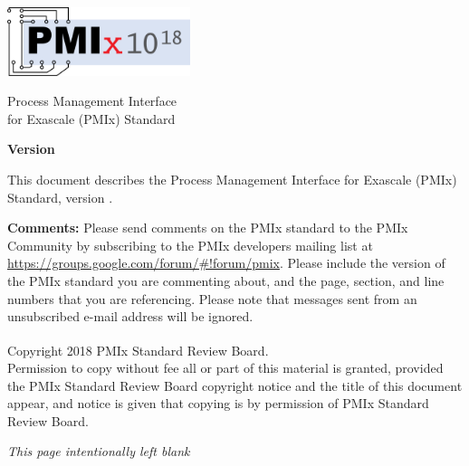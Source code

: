 
  \begin{titlepage}
    \begin{flushleft}
     \hspace{-6em} \includegraphics[width=0.4\textwidth]{figs/pmix-logo.png}
    \end{flushleft}

    \begin{adjustwidth}{-0.75in}{0in}
    \begin{center}
      \Huge
      \textsf{Process Management Interface\\for Exascale (PMIx) Standard}

      \vspace{1.0in}
	  \huge
      \textbf{Version \VER{}}
      
      \vspace{0.15in}
	  \Large
      \textbf{\VERDATE}
      
    \end{center}
    \end{adjustwidth}

    \vspace{1.2in}

\par
This document describes the Process Management Interface for Exascale (PMIx) Standard, version \VER{}.

\par
\textbf{Comments:}
Please send comments on the PMIx standard to the PMIx Community by subscribing to the PMIx developers mailing list at \url{https://groups.google.com/forum/#!forum/pmix}.
Please include the version of the PMIx standard you are commenting about, and the page, section, and line numbers that you are referencing.
Please note that messages sent from an unsubscribed e-mail address will be ignored.

\vfill

\begin{adjustwidth}{0pt}{1em}\setlength{\parskip}{0.25\baselineskip}%
Copyright \textsuperscript{\textcopyright} 2018 PMIx Standard Review Board.\\
Permission to copy without fee all or part of this material is granted,
provided the PMIx Standard Review Board copyright notice and
the title of this document appear, and notice is given that copying is by
permission of PMIx Standard Review Board.
\end{adjustwidth}

  \end{titlepage}

\clearpage
\thispagestyle{empty}
\phantom{a}
\begin{center}
\emph{This page intentionally left blank}
\end{center}

\vfill

